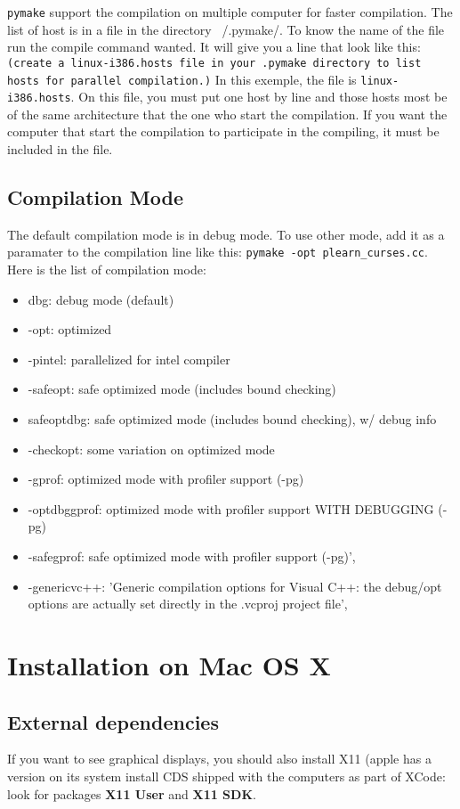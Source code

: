 \documentclass[11pt]{book}
\begin{document}
\verb!pymake! support the compilation on multiple computer for faster 
compilation. The list of host is in a file in the directory ~/.pymake/. To know the name of the file run the compile command wanted. It will give you a line that look like this: \verb!(create a linux-i386.hosts file in your .pymake directory to list hosts for parallel compilation.)! In this exemple, the file is \verb!linux-i386.hosts!.
On this file, you must put one host by line and those hosts most be of the same architecture that the one who start the compilation. If you want the computer that start the compilation to participate in the compiling, it must be included in the file.

\subsection{Compilation Mode}

The default compilation mode is in debug mode. To use other mode, add it as a paramater to the compilation line like this: \verb!pymake -opt plearn_curses.cc!.
Here is the list of compilation mode:
\begin{itemize}
\item dbg: debug mode (default)
\item -opt: optimized
\item -pintel: parallelized for intel compiler
\item -safeopt: safe optimized mode (includes bound checking)
\item safeoptdbg: safe optimized mode (includes bound checking), w/ debug info
\item -checkopt: some variation on optimized mode
\item -gprof: optimized mode with profiler support (-pg)
\item -optdbggprof: optimized mode with profiler support WITH DEBUGGING (-pg)
\item -safegprof: safe optimized mode with profiler support (-pg)',
\item -genericvc++: 'Generic compilation options for Visual C++: the debug/opt options are actually set directly in the .vcproj project file',
\end{itemize}

\section{Installation on Mac OS X}

\subsection{External dependencies}
If you want to see graphical displays, you should also install X11 (apple
has a version on its system install CDS shipped with the computers as part
of XCode: look for packages {\bf X11 User} and {\bf X11 SDK}.
\end{document}
